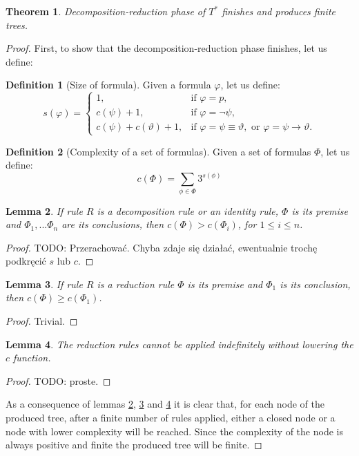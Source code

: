\documentclass{article}
\newtheorem{theorem}{Theorem}
\newtheorem{lemma}[theorem]{Lemma}
\theoremstyle{definition}
\newtheorem{definition}{Definition}[section]
\newcommand*{\Ts}{T^*}
\begin{document}
\begin{theorem}
    Decomposition-reduction phase of $\Ts$ finishes and produces finite trees.
\end{theorem}
\begin{proof}

    First, to show that the decomposition-reduction phase finishes, let us define:

    \begin{definition}[Size of formula]
        Given a formula $\varphi$, let us define:
        $$
        s(\varphi) = \begin{cases}
            1, &\text{if } \varphi = p,\\
            c(\psi) + 1, &\text{if } \varphi = \lnot \psi,\\
            c(\psi) + c(\vartheta) + 1, &\text{if } \varphi = \psi \equiv \vartheta,\text{ or } \varphi = \psi \rightarrow \vartheta.
        \end{cases}
        $$
    \end{definition}
    \begin{definition}[Complexity of a set of formulas]
        Given a set of formulas $\Phi$, let us define:
        $$
            c(\Phi) = \sum_{\phi \in \Phi} 3^{s(\phi)}
        $$
    \end{definition}

    \begin{lemma}
        \label{l_c}
        If rule $R$ is a decomposition rule or an identity rule, $\Phi$ is its premise and $\Phi_1, ... \Phi_n$ are its conclusions, then $c(\Phi) > c(\Phi_i)$, for $1 \leq i \leq n$.
    \end{lemma}
    \begin{proof}
        TODO: Przerachować. Chyba zdaje się działać, ewentualnie trochę podkręcić $s$ lub $c$.
    \end{proof}
    \begin{lemma}
        \label{l_c2}
        If rule $R$ is a reduction rule $\Phi$ is its premise and $\Phi_1$ is its conclusion, then $c(\Phi) \geq c(\Phi_1)$.
    \end{lemma}
    \begin{proof}
        Trivial.
    \end{proof}
    \begin{lemma}
        \label{l_c3}
        The reduction rules cannot be applied indefinitely without lowering the $c$ function.
    \end{lemma}
    \begin{proof}
        TODO: proste.
    \end{proof}

    As a consequence of lemmas \ref{l_c}, \ref{l_c2} and \ref{l_c3} it is clear that, for each node of the produced tree, after a finite number of rules applied, either a closed node or a node with lower complexity will be reached. Since the complexity of the node is always positive and finite the produced tree will be finite.

\end{proof}
\end{document}

